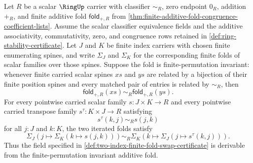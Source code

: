 \begin{theorem}
\label{thm:two-index-fold-swap-from-finite-permutation-invariance}
Let $R$ be a scalar $\RingUp$ carrier with classifier $\sim_R$, zero endpoint $0_R$, addition $+_R$, and finite additive fold $\mathsf{fold}_{+,R}$ from \autoref{thm:finite-additive-fold-congruence-coefficient-lists}. Assume the scalar classifier equivalence fields and the additive associativity, commutativity, zero, and congruence rows retained in \autoref{def:ring-stability-certificate}. Let $J$ and $K$ be finite index carriers with chosen finite enumerating spines, and write $\Sigma_J$ and $\Sigma_K$ for the corresponding finite folds of scalar families over those spines. Suppose the fold is finite-permutation invariant: whenever finite carried scalar spines $xs$ and $ys$ are related by a bijection of their finite position spines and every matched pair of entries is related by $\sim_R$, then
$$
\mathsf{fold}_{+,R}(xs)\sim_R\mathsf{fold}_{+,R}(ys).
$$
For every pointwise carried scalar family $s:J\times K\to R$ and every pointwise carried transpose family $s^\tau:K\times J\to R$ satisfying
$$
s^\tau(k,j)\sim_R s(j,k)
$$
for all $j:J$ and $k:K$, the two iterated folds satisfy
$$
\Sigma_J(j\mapsto\Sigma_K(k\mapsto s(j,k)))\sim_R\Sigma_K(k\mapsto\Sigma_J(j\mapsto s^\tau(k,j))).
$$
Thus the field specified in \autoref{def:two-index-finite-fold-swap-certificate} is derivable from the finite-permutation invariant additive fold.
\end{theorem}
